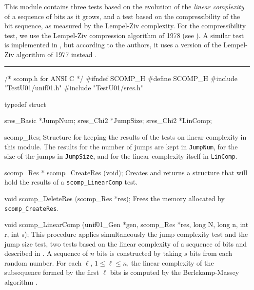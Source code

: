 
This module contains three tests based on the evolution of the
{\em linear complexity\/} of a sequence of bits as it grows,%
and a test based on the compressibility of the bit sequence,
as measured by the Lempel-Ziv complexity.%
For the compressibility test, we use the Lempel-Ziv compression
algorithm of 1978 (see \cite{iZIV78a}).
A similar test is implemented in \cite{rERD92a,rRUK01a},
but according to the authors, it uses a version of
the Lempel-Ziv algorithm of 1977 instead \cite{iZIV77a}.
\resdef


\bigskip
\hrule
\code\hide
/* scomp.h  for ANSI C */
#ifndef SCOMP_H
#define SCOMP_H
\endhide
#include "TestU01/unif01.h"
#include "TestU01/sres.h"
\endcode

\ifdetailed  %

\code
typedef struct {

   sres_Basic *JumpNum;
   sres_Chi2 *JumpSize;
   sres_Chi2 *LinComp;

} scomp_Res;
\endcode
 \tab
  Structure for keeping the results of the tests on linear complexity
  in this module. The results for the number of jumps are kept in
  {\tt JumpNum}, for the size of the jumps in {\tt JumpSize}, and for the
  linear complexity itself in  {\tt LinComp}.
 \endtab
\code


scomp_Res * scomp_CreateRes (void);
\endcode
 \tab
  Creates and returns a structure that will hold the results
  of a  {\tt scomp\_LinearComp} test.
 \endtab
\code


void scomp_DeleteRes (scomp_Res *res);
\endcode
 \tab
  Frees the memory allocated by {\tt scomp\_CreateRes}.
 \endtab

\fi %



\code
void scomp_LinearComp (unif01_Gen *gen, scomp_Res *res,
                       long N, long n, int r, int s);
\endcode
\tab {} %
  This procedure applies simultaneously the jump complexity test and the jump
  size test, two tests based on the linear complexity of a sequence of bits and
  described in \cite{rCAR89a,rERD92a}. A sequence of $n$ bits is constructed by
  taking $s$ bits from each random number. For each $\ell$, $1\le \ell\le n$,
  the linear complexity of the subsequence formed by the first $\ell$ bits is
  computed by the  Berlekamp-Massey algorithm \cite{mBER84a,mMAS69a}.

